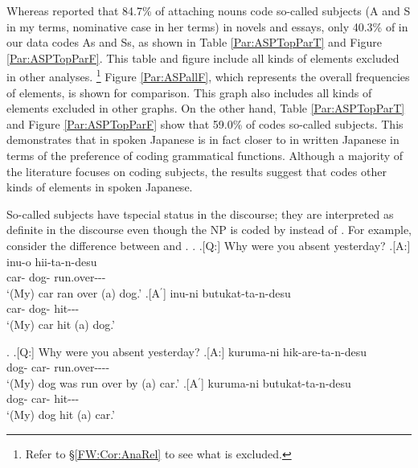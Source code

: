 Whereas  reported that
84.7\% of  attaching nouns code so-called subjects (A and S in my terms, nominative case in her terms) in novels and essays,
only 40.3\% of  in our data codes As and Ss,
as shown in Table \ref{Par:ASPTopParT} and Figure \ref{Par:ASPTopParF}.
This table and figure include all kinds of elements excluded in other analyses.%
 \footnote{
 Refer to \S \ref{FW:Cor:AnaRel} to see what is excluded.
 }
Figure \ref{Par:ASPallF},
which represents the overall frequencies of elements,
is shown for comparison.
This graph also includes all kinds of elements excluded in other graphs.
On the other hand, Table \ref{Par:ASPTopParT} and Figure \ref{Par:ASPTopParF} show that
59.0\% of  codes so-called subjects.
This demonstrates that
 in spoken Japanese is in fact closer to  in written Japanese
in terms of the preference of coding grammatical functions. %
Although a majority of the literature focuses on  coding subjects,
the results suggest that  codes other kinds of elements in spoken Japanese.

So-called subjects have tspecial status in the discourse;
they are interpreted as definite in the discourse
even though the NP is coded by  instead of .
For example,
consider the difference between \Next and \NNext.
%
\ex.
 \a.[Q:] Why were you absent yesterday?
 \bg.[A:]  inu-o hii-ta-n-desu \\
		car- dog- run.over--- \\
		`(My) car ran over (a) dog.'
 \bg.[A$^{\prime}$]  inu-ni butukat-ta-n-desu \\
   car- dog- hit--- \\
   `(My) car hit (a) dog.'
	
\ex. \a.[Q:] Why were you absent yesterday?
	\bg.[A:]  kuruma-ni hik-are-ta-n-desu \\
		dog- car- run.over---- \\
		`(My) dog was run over by (a) car.'
 \bg.[A$^{\prime}$]  kuruma-ni butukat-ta-n-desu \\
   dog- car- hit--- \\
   `(My) dog hit (a) car.'

